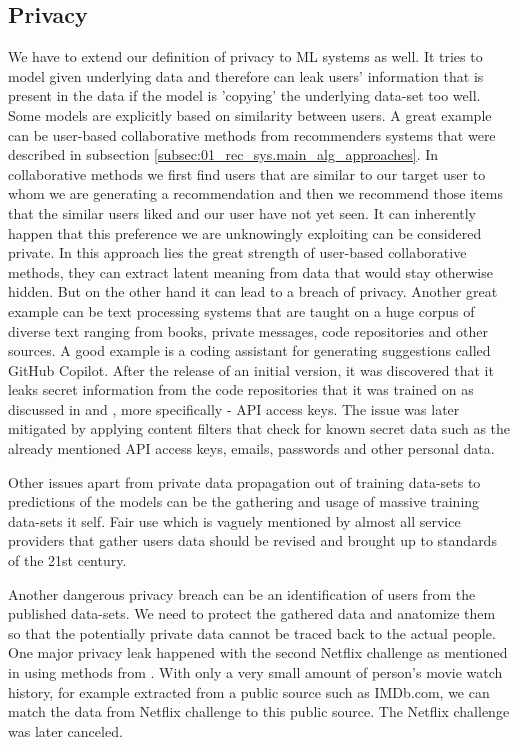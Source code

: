 \subsection{Privacy}
We have to extend our definition of privacy to ML systems as well. It tries to model given underlying data and therefore can leak users' information that is present in the data if the model is 'copying' the underlying data-set too well. Some models are explicitly based on similarity between users. A great example can be user-based collaborative methods from recommenders systems that were described in subsection \ref{subsec:01_rec_sys.main_alg_approaches}. In collaborative methods we first find users that are similar to our target user to whom we are generating a recommendation and then we recommend those items that the similar users liked and our user have not yet seen. It can inherently happen that this preference we are unknowingly exploiting can be considered private. In this approach lies the great strength of user-based collaborative methods, they can extract latent meaning from data that would stay otherwise hidden. But on the other hand it can lead to a breach of privacy.
Another great example can be text processing systems that are taught on a huge corpus
of diverse text ranging from books, private messages, code repositories and other sources. A good example is a coding assistant for generating suggestions called GitHub Copilot. After the release of an initial version, it was discovered that it leaks secret information from the code repositories that it was trained on as discussed in \cite{github_copilot_leaks_2} and \cite{github_copilot_leaks}, more specifically - API access keys. The issue was later mitigated by applying content filters that check for known secret data such as the already mentioned API access keys, emails, passwords and other personal data.

Other issues apart from private data propagation out of training data-sets to predictions of the models can be the gathering and usage of massive training data-sets it self. Fair use which is vaguely mentioned by almost all service providers that gather users data should be revised and brought up to standards of the 21st century.

Another dangerous privacy breach can be an identification of users from the published data-sets. We need to protect the gathered data and anatomize them so that the potentially private data cannot be traced back to the actual people. One major privacy leak happened with the second Netflix challenge as mentioned in \cite{netflix_leak_2010} using methods from \cite{netflix_leak_method_2008}. With only a very small amount of person's movie watch history, for example extracted from a public source such as IMDb.com, we can match the data from Netflix challenge to this public source. The Netflix challenge was later canceled.

